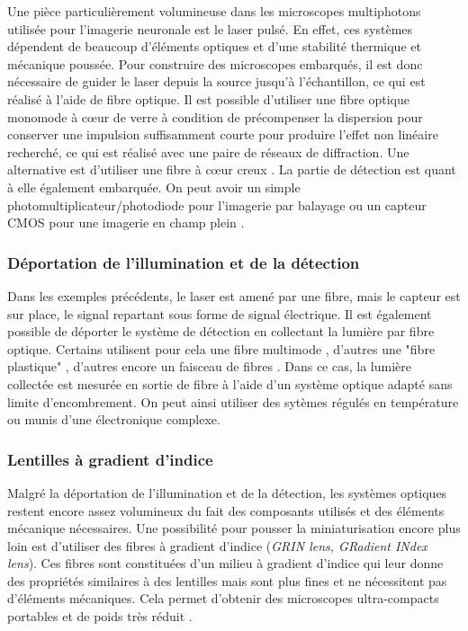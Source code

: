 Une pièce particulièrement volumineuse dans les microscopes multiphotons utilisée pour l'imagerie neuronale est le laser pulsé. En effet, ces systèmes dépendent de beaucoup d'éléments optiques et d'une stabilité thermique et mécanique poussée. Pour construire des microscopes embarqués, il est donc nécessaire de guider le laser depuis la source jusqu'à l'échantillon, ce qui est réalisé à l'aide de fibre optique. Il est possible d'utiliser une fibre optique monomode à cœur de verre \cite{helmchen_miniature_2001} \cite{sawinski_visually_2009} \cite{zong_fast_2017} à condition de précompenser la dispersion pour conserver une impulsion suffisamment courte pour produire l'effet non linéaire recherché, ce qui est réalisé avec une paire de réseaux de diffraction. Une alternative est d'utiliser une fibre à cœur creux \cite{tai_two-photon_2004} \cite{choi_improving_2014} \cite{piyawattanametha_vivo_2009} \cite{klioutchnikov_three-photon_2020}.
La partie de détection est quant à elle également embarquée. On peut avoir un simple photomultiplicateur/photodiode pour l'imagerie par balayage \cite{helmchen_miniature_2001} ou un capteur CMOS pour une imagerie en champ plein \cite{scott_imaging_2018}.

\subsubsection{Déportation de l'illumination et de la détection}

Dans les exemples précédents, le laser est amené par une fibre, mais le capteur est sur place, le signal repartant sous forme de signal électrique. Il est également possible de déporter le système de détection en collectant la lumière par fibre optique. Certains utilisent pour cela une fibre multimode \cite{piyawattanametha_vivo_2009} \cite{sawinski_visually_2009}, d'autres une "fibre plastique" \cite{klioutchnikov_three-photon_2020}, d'autres encore un faisceau de fibres \cite{zong_fast_2017}. Dans ce cas, la lumière collectée est mesurée en sortie de fibre à l'aide d'un système optique adapté sans limite d'encombrement. On peut ainsi utiliser des sytèmes régulés en température ou munis d'une électronique complexe.

\subsubsection{Lentilles à gradient d'indice}

Malgré la déportation de l'illumination et de la détection, les systèmes optiques restent encore assez volumineux du fait des composants utilisés et des éléments mécanique nécessaires. Une possibilité pour pousser la miniaturisation encore plus loin est d'utiliser des fibres à gradient d'indice (\emph{GRIN lens, GRadient INdex lens}). Ces fibres sont constituées d'un milieu à gradient d'indice qui leur donne des propriétés similaires à des lentilles mais sont plus fines et ne nécessitent pas d'éléments mécaniques. Cela permet d'obtenir des microscopes ultra-compacts portables et de poids très réduit \cite{flusberg_vivo_2005}\cite{engelbrecht_ultra-compact_2008}.

